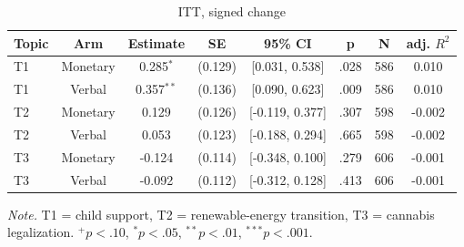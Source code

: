 \begin{table}[htbp]
\centering
\begin{threeparttable}
\caption{ITT, signed change}
\label{tab:tab_itt_signed}
\begin{tabular}{lccccccc}
\toprule
  Topic & Arm & Estimate & SE & 95\% CI & p & N & adj. $R^2$ \\
\midrule
  T1 & Monetary & 0.285$^{*}$ & (0.129) & [0.031, 0.538] & .028 & 586 & 0.010 \\
  T1 & Verbal & 0.357$^{**}$ & (0.136) & [0.090, 0.623] & .009 & 586 & 0.010 \\
  T2 & Monetary & 0.129 & (0.126) & [-0.119, 0.377] & .307 & 598 & -0.002 \\
  T2 & Verbal & 0.053 & (0.123) & [-0.188, 0.294] & .665 & 598 & -0.002 \\
  T3 & Monetary & -0.124 & (0.114) & [-0.348, 0.100] & .279 & 606 & -0.001 \\
  T3 & Verbal & -0.092 & (0.112) & [-0.312, 0.128] & .413 & 606 & -0.001 \\
\bottomrule
\end{tabular}
\begin{tablenotes}\footnotesize\item \textit{Note.} T1 = child support, T2 = renewable-energy transition, T3 = cannabis legalization. $^{+}p<.10$, $^{*}p<.05$, $^{**}p<.01$, $^{***}p<.001$.\end{tablenotes}
\end{threeparttable}
\end{table}
